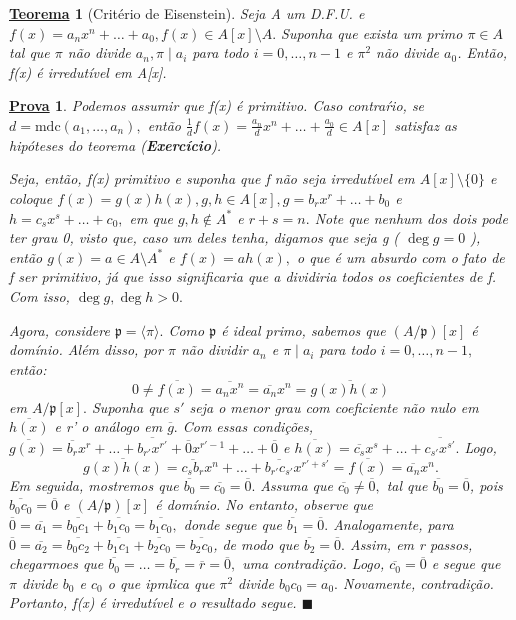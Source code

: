 \documentclass{article}
\newtheorem*{theorem*}{\underline{Teorema}}
\newtheorem*{proof*}{\underline{Prova}}
\renewcommand\qedsymbol{$\blacksquare$}
\begin{document}
\begin{theorem*}[Critério de Eisenstein]
  Seja A um D.F.U. e \(f(x) = a_{n}x^{n} + \dotsc + a_{0}, f(x)\in A[x]\setminus{A}.\) Suponha que exista um primo \(\pi \in A\) tal que 
 \(\pi \) não divide \(a_{n}, \pi \mid a_{i}\) para todo \(i=0, \dotsc , n-1\) e \(\pi^{2}\) não divide \(a_{0}\). Então, f(x) é irredutível em 
 A[x].
\end{theorem*}
\begin{proof*}
  Podemos assumir que f(x) é primitivo. Caso contraŕio, se \(d = \mathrm{mdc}(a_{1}, \dotsc ,a_{n}),\) então
  \(\frac{1}{d}f(x) = \frac{a_{n}}{d}x^{n} + \dotsc + \frac{a_{0}}{d}\in A[x]\) satisfaz as hipóteses do teorema (\textbf{Exercício}).

  Seja, então, f(x) primitivo e suponha que f não seja irredutível em \(A[x]\setminus{\{0\}}\) e coloque
 \(f(x) = g(x)h(x), g, h\in A[x], g = b_{r}x^{r} + \dotsc  + b_{0}\) e \(h = c_{s}x^{s} + \dotsc +c_{0},\) em que
 \(g,h\not\in A^{*}\) e \(r+s = n.\) Note que nenhum dos dois pode ter grau 0, visto que, caso um deles tenha, digamos que seja g ( \(\deg{g} = 0\) ), então
 \(g(x)=a\in A\setminus{A^{*}}\) e \(f(x) = ah(x),\) o que é um absurdo com o fato de f ser primitivo, já que isso significaria que a dividiria todos os coeficientes
 de f. Com isso, \(\deg{g}, \deg{h} > 0.\)

  Agora, considere \(\mathfrak{p} = \langle \pi  \rangle.\) Como \(\mathfrak{p}\) é ideal primo, sabemos que 
 \((A/\mathfrak{p})[x]\) é domínio. Além disso, por \(\pi \) não dividir \(a_{n}\) e \(\pi \mid a_{i}\) para todo \(i=0, \dotsc , n-1,\) então:
  \[
    0\neq \overline{f(x)} = \overline{a_{n}x^{n}} = \overline{a_{n}}x^{n} = \overline{g(x)h(x)}
  \]
em \(A/\mathfrak{p}[x].\) Suponha que \(s'\) seja o menor grau com coeficiente não nulo em \(\overline{h(x)}\) e r' o análogo em \(\overline{g}.\) 
Com essas condições, \(\overline{g(x)} = \overline{b_{r}}x^{r} + \dotsc + \overline{b_{r'}x^{r'}} + \overline{0}x^{r'-1} + \dotsc + \overline{0}\) e
 \(\overline{h(x)} = \overline{c_{s}}x^{s} + \dotsc + \overline{c_{s'}x^{s'}}.\) Logo, 
  \[
    \overline{g(x)h(x)} = \overline{c_{s}b_{r}}x^{n} + \dotsc + \overline{b_{r'}c_{s'}}x^{r'+s'} = \overline{f(x)} = \overline{a_{n}}x^{n}.
  \]
  Em seguida, mostremos que \(\overline{b_{0}} = \overline{c_{0}} = \overline{0}.\) Assuma que \(\overline{c_{0}}\neq \overline{0},\) tal que \(\overline{b_{0}}=\overline{0}\), pois
 \(\overline{b_{0}c_{0}} = \overline{0}\) e \((A/\mathfrak{p})[x]\) é domínio. No entanto, observe que \(\overline{0} = \overline{a_{1}} = \overline{b_{0}c_{1}} + \overline{b_{1}c_{0}} = \overline{b_{1}c_{0}},\)
 donde segue que \(\overline{b_{1}} = \overline{0}.\) Analogamente, para \(\overline{0} = \overline{a_{2}} = \overline{b_{0}c_{2}}+\overline{b_{1}c_{1}}+\overline{b_{2}c_{0}} = \overline{b_{2}c_{0}}\),
 de modo que \(\overline{b_{2}} = \overline{0}.\) Assim, em r passos, chegarmoes que \(\overline{b_{0}} = \dotsc = \overline{b_{r}} = \overline{r} = \overline{0},\) uma contradição.
 Logo, \(\overline{c_{0}} = \overline{0}\) e segue que \(\pi \) divide \(b_{0}\) e \(c_{0}\) o que ipmlica que \(\pi^{2}\) divide \(b_{0}c_{0} = a_{0}.\) Novamente, 
 contradição. Portanto, f(x) é irredutível e o resultado segue. \qedsymbol
\end{proof*}
\newpage
\end{document}
